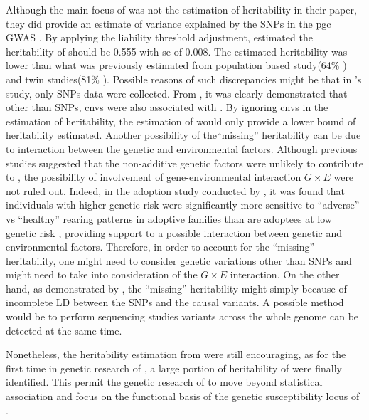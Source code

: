	Although the main focus of \citet{Bulik-Sullivan2015} was not the estimation of heritability in their paper, they did provide an estimate of variance explained by the \glspl{SNP} in the \gls{pgc}  \gls{GWAS} \citep{Ripke2014}.
	By applying the liability threshold adjustment, \citet{Bulik-Sullivan2015} estimated the heritability of  should be 0.555 with \gls{se} of 0.008.
	The estimated heritability was lower than what was previously estimated from population based study(64\% \citep{Lichtenstein2009}) and twin studies(81\% \citep{Sullivan2003}).
	Possible reasons of such discrepancies might be that in \citet{Ripke2014}'s study, only \glspl{SNP} data were collected. 
	From \citet{Szatkiewicz2014}, it was clearly demonstrated that other than \glspl{SNP}, \glspl{cnv} were also associated with .
	By ignoring \glspl{cnv} in the estimation of heritability, the estimation of \citet{Bulik-Sullivan2015} would only provide a lower bound of heritability estimated.
	Another possibility of the``missing'' heritability can be due to interaction between the genetic and environmental factors. 
	Although previous studies \citep{Gottesman01071967} suggested that the non-additive genetic factors were unlikely to contribute to , the possibility of involvement of gene-environmental interaction $G\times E$ were not ruled out.
	Indeed, in the adoption study conducted by \citet{Tienari2004}, it was found that individuals with higher genetic risk were significantly more sensitive to ``adverse'' vs ``healthy'' rearing patterns in adoptive families than are adoptees at low genetic risk \citep{Tienari2004}, providing support to a possible interaction between genetic and environmental factors.
	Therefore, in order to account for the ``missing'' heritability, one might need to consider genetic variations other than \glspl{SNP} and might need to take into consideration of the $G\times E$ interaction.
	On the other hand, as demonstrated by \citet{Yang2010a}, the ``missing'' heritability might simply because of incomplete \gls{LD} between the \glspl{SNP} and the causal variants. 
	A possible method would be to perform sequencing studies variants across the whole genome can be detected at the same time.
	
	Nonetheless, the heritability estimation from \citet{Ripke2014} were still encouraging, as for the first time in genetic research of , a large portion of heritability of  were finally identified.
	This permit the genetic research of  to move beyond statistical association and focus on the functional basis of the genetic susceptibility locus of .
	
